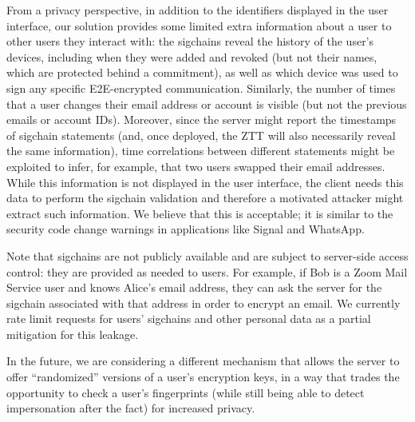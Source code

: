 From a privacy perspective, in addition to the identifiers displayed in the user interface, our
solution provides some limited extra information about a user to other users they interact with: the
sigchains reveal the history of the user's devices, including when they were added and revoked (but
not their names, which are protected behind a commitment), as well as which device was used to sign
any specific E2E-encrypted communication. Similarly, the number of times that a user changes their
email address or account is visible (but not the previous emails or account IDs). Moreover, since
the server might report the timestamps of sigchain statements (and, once deployed, the ZTT will also
necessarily reveal the same information), time correlations between different statements might be
exploited to infer, for example, that two users swapped their email addresses. While this
information is not displayed in the user interface, the client needs this data to perform the
sigchain validation and therefore a motivated attacker might extract such information. We believe
that this is acceptable; it is similar to the security code change warnings in applications like
Signal and WhatsApp.

Note that sigchains are not publicly available and are subject to server-side access control: they
are provided as needed to users. For example, if Bob is a Zoom Mail Service user and knows Alice's
email address, they can ask the server for the sigchain associated with that address in order to
encrypt an email. We currently rate limit requests for users' sigchains and other personal data as a
partial mitigation for this leakage.

In the future, we are considering a different mechanism that allows the server to offer
``randomized'' versions of a user's encryption keys, in a way that trades the opportunity to check a
user's fingerprints (while still being able to detect impersonation after the fact) for increased
privacy.
